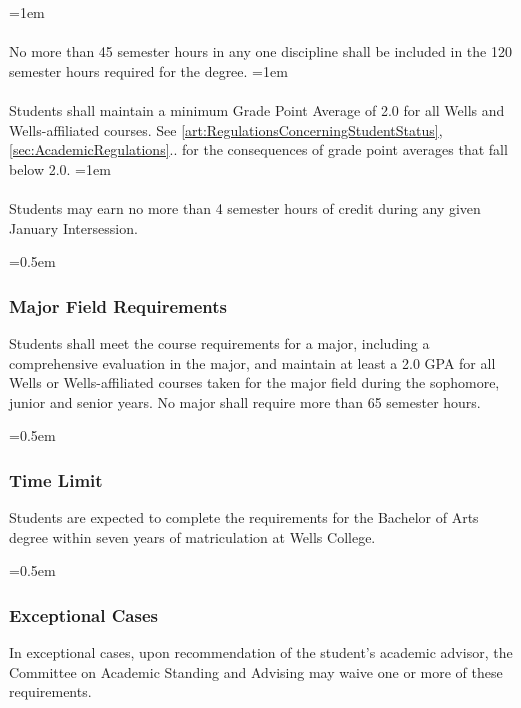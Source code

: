 \documentclass{manual}
\newcommand{\modified}[1]{}
\newcommand{\oldbreak}[1]{}
\let\oldsubsubsection\subsubsection
\renewcommand\subsubsection{\leftskip=0.5em\oldsubsubsection}
\let\oldparagraph\paragraph
\renewcommand\paragraph{\leftskip=1em\oldparagraph}
\begin{document}
\paragraph{} No more than 45 semester hours in any one discipline shall be included \modified{5/13/93}  in the 120 semester hours required for the degree.
\paragraph{} Students shall maintain a minimum Grade Point Average of 2.0 for all Wells and Wells-affiliated courses. See \cref{art:RegulationsConcerningStudentStatus}, \cref{sec:AcademicRegulations}.. for the consequences of grade point averages that fall below 2.0.
\paragraph{} Students may earn no more than 4 semester hours of credit during any given January  Intersession.\modified{2/8/05}


\oldbreak{IV-I}

\subsubsection{Major Field Requirements}

Students \modified{5/13/93} shall meet the course requirements for a major, including a comprehensive evaluation in the major, and maintain at least a 2.0 GPA for all Wells or Wells-affiliated courses taken for the major field during the sophomore, junior and senior years. No major shall require more than 65 semester hours.

\subsubsection{Time Limit}

Students are expected to complete the requirements for the Bachelor of Arts degree within seven years of matriculation at Wells College. 

\subsubsection{Exceptional Cases}

In exceptional cases, upon recommendation of the student's academic advisor, the Committee on Academic Standing and Advising may waive one or more of these requirements.
\end{document}
